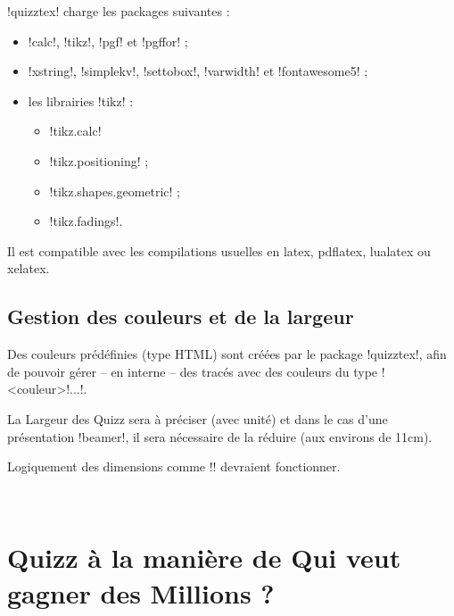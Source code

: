 \documentclass[french,a4paper,11pt]{article}
\begin{document}
\begin{noteblock}
\packagetex!quizztex! charge les packages suivantes :

\begin{itemize}
	\item \packagetex!calc!, \packagetex!tikz!, \packagetex!pgf! et \packagetex!pgffor! ;
	\item \packagetex!xstring!, \packagetex!simplekv!, \packagetex!settobox!, \packagetex!varwidth! et \packagetex!fontawesome5! ;
	\item les librairies \packagetex!tikz! :
	\begin{itemize}
		\item \packagetex!tikz.calc!
		\item \packagetex!tikz.positioning! ;
		\item \packagetex!tikz.shapes.geometric! ;
		\item \packagetex!tikz.fadings!.
	\end{itemize}
\end{itemize}

Il est compatible avec les compilations usuelles en \textsf{latex}, \textsf{pdflatex}, \textsf{lualatex} ou \textsf{xelatex}.
\end{noteblock}

\subsection{Gestion des couleurs et de la largeur}

\begin{tipblock}
Des couleurs prédéfinies (type \textsf{HTML}) sont créées par le package \packagetex!quizztex!, afin de pouvoir gérer -- en interne -- des tracés avec des couleurs du type \motcletex!<couleur>!...!.
\end{tipblock}

\begin{tipblock}
La Largeur des Quizz sera à préciser (avec unité) et dans le cas d'une présentation \packagetex!beamer!, il sera nécessaire de la réduire (aux environs de 11cm).

Logiquement des dimensions comme \motcletex!\linewidth! devraient fonctionner.
\end{tipblock}

\vfill~

\pagebreak

\section{Quizz à la manière de \og Qui veut gagner des Millions ? \fg}
\end{document}
